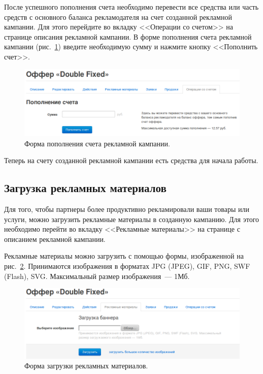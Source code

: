 \documentclass[a4paper,12pt]{article}
\begin{document}
После успешного пополнения счета необходимо перевести все средства или часть средств с основного баланса рекламодателя на счет созданной рекламной кампании. Для этого перейдите во вкладку <<Операции со счетом>> на странице описания рекламной кампании. В форме пополнения счета рекламной кампании (рис.~\ref{fig:offer-operations}) введите необходимую сумму и нажмите кнопку <<Пополнить счет>>.

\begin{figure}[!ht]
\centering
\includegraphics[width=\textwidth]{include/offer-operations.png}
\caption{Форма пополнения счета рекламной кампании.}
\label{fig:offer-operations}
\end{figure}

Теперь на счету созданной рекламной кампании есть средства для начала работы.

\subsection{Загрузка рекламных материалов}

Для того, чтобы партнеры более продуктивно рекламировали ваши товары или услуги, можно загрузить рекламные материалы в созданную кампанию. Для этого необходимо перейти во вкладку <<Рекламные материалы>> на странице с описанием рекламной кампании.

Рекламные материалы можно загрузить с помощью формы, изображенной на рис.~\ref{fig:materials}. Принимаются изображения в форматах JPG (JPEG), GIF, PNG, SWF (Flash), SVG. Максимальный размер изображения~--- 1Мб.

\begin{figure}[!ht]
\centering
\includegraphics[width=\textwidth]{include/materials.png}
\caption{Форма загрузки рекламных материалов.}
\label{fig:materials}
\end{figure}
\end{document}
